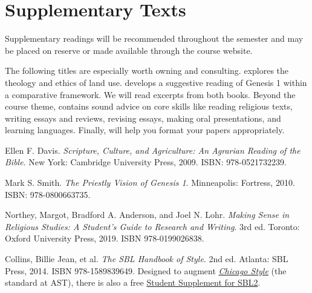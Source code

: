 \documentclass[titlepage]{article}
\begin{document}
\section{Supplementary Texts}
\label{supplementary}

Supplementary readings will be recommended throughout the semester and
may be placed on reserve or made available through the course website.

The following titles are especially worth owning and consulting.
\cite{ed} explores the theology and ethics of land use. \cite{ms}
develops a suggestive reading of Genesis 1 within a comparative
framework. We will read excerpts from both books. Beyond the course
theme, \cite{rlgs} contains sound advice on core skills like reading
religious texts, writing essays and reviews, revising essays, making
oral presentations, and learning languages. Finally, \cite{sbl2} will
help you format your papers appropriately.

\begingroup
\renewcommand{\section}[2]{}%
\begin{thebibliography}{Making Sense}%

	 Ellen F. Davis.
	\emph{Scripture, Culture, and Agriculture: An Agrarian Reading of the Bible}.
	New York: Cambridge University Press, 2009.
	ISBN: 978-0521732239.

	 Mark S. Smith.
	\emph{The Priestly Vision of Genesis 1}.
	Minneapolis: Fortress, 2010.
	ISBN: 978-0800663735.

	 Northey, Margot, Bradford A. Anderson, and Joel N. Lohr.
	\emph{Making Sense in Religious Studies: A Student's Guide to Research and Writing}.
	3rd ed. Toronto: Oxford University Press, 2019. ISBN 978-0199026838.

	 Collins, Billie Jean, et al.
	\emph{The SBL Handbook of Style}.
	2nd ed. Atlanta: SBL Press, 2014. ISBN 978-1589839649.
	Designed to augment \href{http://www.chicagomanualofstyle.org/home.html}{\emph{Chicago Style}}
	(the standard at AST), there is also a free
	\href{https://www.sbl-site.org/assets/pdfs/pubs/SBLHSsupp2015-02.pdf}{Student Supplement for SBL2}.

\end{thebibliography}
\endgroup
\end{document}
